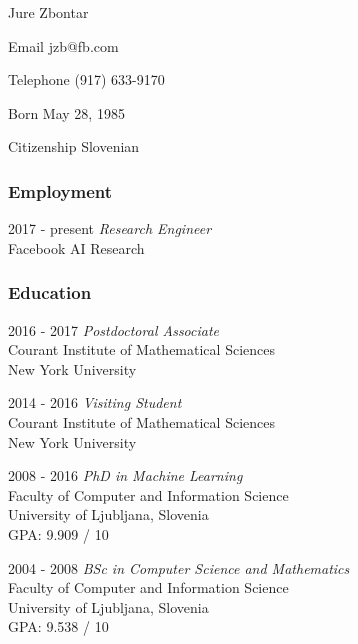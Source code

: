 \documentclass[12pt,a4paper]{article}
\begin{document}
\begin{cv}{Jure Zbontar}

\begin{cvlist}{}
\item[Email] jzb@fb.com
\item[Telephone] (917) 633-9170
\item[Born] May 28, 1985
\item[Citizenship] Slovenian

\end{cvlist}

\subsubsection*{Employment}
\begin{cvlist}{}
\item[2017 - present] \emph{Research Engineer} \\
Facebook AI Research
\end{cvlist}

\subsubsection*{Education}
\begin{cvlist}{}

\item[2016 - 2017] \emph{Postdoctoral Associate} \\
Courant Institute of Mathematical Sciences \\
New York University

\item[2014 - 2016] \emph{Visiting Student} \\
Courant Institute of Mathematical Sciences \\
New York University

\item[2008 - 2016] \emph{PhD in Machine Learning} \\
Faculty of Computer and Information Science \\
University of Ljubljana, Slovenia \\
GPA: 9.909 / 10

\item[2004 - 2008] \emph{BSc in Computer Science and Mathematics} \\
Faculty of Computer and Information Science \\
University of Ljubljana, Slovenia \\
GPA: 9.538 / 10


\end{cvlist}
\end{cv}
\end{document}
